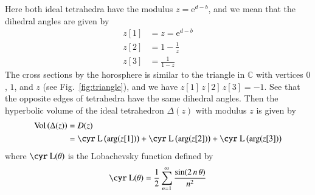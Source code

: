 \documentclass[12pt,reqno]{amsart}
\numberwithin{equation}{section}
\DeclareMathOperator{\Vol}{Vol}
\newcommand{\E}{\mathrm{e}}
\newcommand{\Lob}{\text{\cyr L}}
\begin{document}
Here both ideal tetrahedra have the modulus $z = \E^{d-b}$,
and we mean that the dihedral angles are given by
\begin{align*}
  z[1] & = z=  \E^{d-b} 
  \\[2mm]
  z[2] & = 1- \frac{1}{z} 
  \\[2mm]
  z[3] & = \frac{1}{1-z} 
\end{align*}
The cross sections by the horosphere
is similar to the triangle
in $\mathbb{C}$ with vertices $0$, $1$, and $z$ (see
Fig.~\ref{fig:triangle}),
and we have
$z[1] \, z[2] \, z[3] = -1$.
See that the opposite edges of tetrahedra have the same dihedral angles.
Then  the hyperbolic volume of the ideal tetrahedron
$\Delta(z)$ with modulus $z$ is
given by~\cite{WPThurs80Lecture}
\begin{align}
  \Vol \left( \Delta(z) \right)
  & =
  D(z)
  \nonumber
  \\
  & =
  \Lob \left(\arg(z[1]) \right)
  + \Lob \left(\arg(z[2]) \right)
  + \Lob \left( \arg(z[3]) \right)
\end{align}
where $\Lob(\theta)$  is the Lobachevsky function defined by
\begin{equation}
  \Lob(\theta)
  =
  \frac{1}{2} \sum_{n=1}^\infty \frac{\sin(2 \, n \, \theta)}{n^2}
\end{equation}
\end{document}
